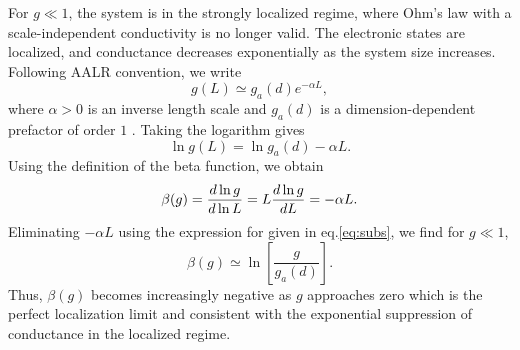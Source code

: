 For $g\ll 1$, the system is in the strongly localized regime, where Ohm's law with a scale-independent conductivity is no longer valid\cite{Anderson1958,LeeRamakrishnan1985}. The electronic states are localized, and conductance decreases exponentially as the system size increases. Following AALR convention, we write
\begin{equation}
    g(L)\simeq g_a(d)e^{-\alpha L},
\end{equation}
where $\alpha>0$ is an inverse length scale and $g_a(d)$ is a dimension-dependent prefactor of order $1$ \cite{AALR1979}. Taking the logarithm gives
\begin{equation}
    \ln g(L)=\ln g_a(d)-\alpha L.
    \label{eq:subs}
\end{equation}
Using the definition of the beta function, we obtain
\[
    \beta(g)
    =\frac{d\ln g}{d\ln L}
    =L\frac{d\ln g}{dL}\\
    =-\alpha L.
\]
Eliminating $-\alpha L$ using the expression for given in eq.\ref{eq:subs}, we find for $g\ll1$,
\begin{equation}
    \beta(g)\simeq
    \ln\!\left[\frac{g}{g_a(d)}\right].
    \label{eq:exp_regime}
\end{equation}
Thus, $\beta(g)$ becomes increasingly negative as $g$ approaches zero which is the perfect localization limit and consistent with the exponential suppression of conductance in the localized regime.
